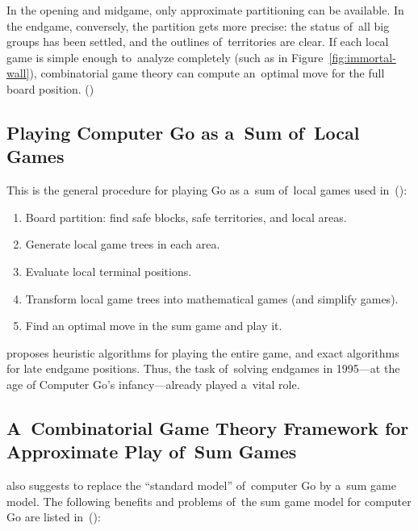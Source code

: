 In the opening and midgame, only approximate partitioning can be available.
In the endgame, conversely, the partition gets more precise:
the status of~all big groups has been settled, and the outlines of~territories are clear.
If each local game is simple enough to~analyze completely (such as in Figure~\ref{fig:immortal-wall}), combinatorial game theory can compute an~optimal move for the full board position.
(\cite{Muller1995computer})

\subsection{Playing Computer Go as a~Sum of~Local Games}

This is the general procedure for playing Go as a~sum of~local games used in~(\cite{Muller1995computer}):
\begin{enumerate}
  \item Board partition: find safe blocks, safe territories, and local areas.
  \item Generate local game trees in each area.
  \item Evaluate local terminal positions.
  \item Transform local game trees into mathematical games (and simplify games).
  \item Find an optimal move in the sum game and play it.
\end{enumerate}
\Mueller{} proposes heuristic algorithms for playing the entire game, and exact algorithms for late endgame positions.
Thus, the task of~solving endgames in 1995---at the age of Computer Go's infancy---already played a~vital role.

\subsection{A~Combinatorial Game Theory Framework for Approximate Play of~Sum Games}

\Mueller{} also suggests to replace the ``standard model'' of~computer Go by a~sum game model.
The following benefits and problems of~the sum game model for computer Go are listed in~(\cite{Muller1995computer}):

\medskip

